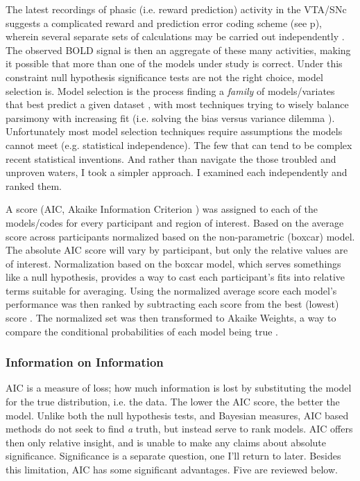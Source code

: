 \documentclass[doc,12pt]{apa}        %
\begin{document}
The latest recordings of phasic (i.e. reward prediction) activity in the VTA/SNc suggests a complicated reward and prediction error coding scheme (see p\pageref{subsub:expectations}), wherein several separate sets of calculations may be carried out independently \cite{Kim:2006p1063, Matsumoto:2009p7219, Smith:2011p8133}.  The observed BOLD signal is then an aggregate of these many activities, making it possible that more than one of the models under study is correct.  Under this constraint null hypothesis significance tests are not the right choice, model selection is.  Model selection is the process finding a \emph{family} of models/variates that best predict a given dataset \cite{Rao:2001p9457}, with most techniques trying to wisely balance parsimony with increasing fit (i.e. solving the bias versus variance dilemma \cite{Geman:1p9469}).  Unfortunately most model selection techniques require assumptions the models cannot meet (e.g. statistical independence).  The few that can tend to be complex recent statistical inventions.  And rather than navigate the those troubled and unproven waters, I took a simpler approach.  I examined each independently and ranked them.

A score (AIC, Akaike Information Criterion \cite{Akaike:1974p9530}) was assigned to each of the models/codes for every participant and region of interest.  Based on the average score across participants normalized based on the non-parametric (boxcar) model.  The absolute AIC score will vary by participant, but only the relative values are of interest.  Normalization based on the boxcar model, which serves somethings like a null hypothesis, provides a way to cast each participant's fits into relative terms suitable for averaging.  Using the normalized average score each model's performance was then ranked by subtracting each score from the best (lowest) score \cite{Anderson:2000p9475}. The normalized set was then transformed to Akaike Weights, a way to compare the conditional probabilities of each model being true \cite{Wagenmakers:2004p9472}.

\subsubsection{Information on Information}
\label{subsub:way}
AIC is a measure of loss; how much information is lost by substituting the model for the true distribution, i.e. the data.  The lower the AIC score, the better the model.  Unlike both the null hypothesis tests, and Bayesian measures, AIC based methods do not seek to find \emph{a} truth, but instead serve to rank models.  AIC offers then only relative insight, and is unable to make any claims about absolute significance.  Significance is a separate question, one I'll return to later.  Besides this limitation, AIC has some significant advantages. Five are reviewed below.
\end{document}
